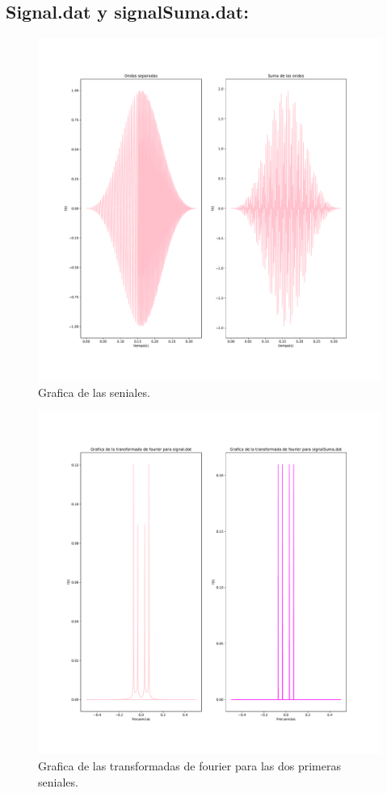 \documentclass[11pt,letterpaper]{exam}
\begin{document}
\subsection{Signal.dat y signalSuma.dat:}
\begin{figure}[H]
    \centering
    \includegraphics[width=1.1\textwidth]{signals.pdf}
    \caption{Grafica de las seniales.}
    \label{fig:my_label}
\end{figure}
\begin{figure}[H]
    \centering
    \includegraphics[width=1.1\textwidth]{Fourier_trans.pdf}
    \caption{Grafica de las transformadas de fourier para las dos primeras seniales.}
    \label{fig:my_label}
\end{figure}
\end{document}

